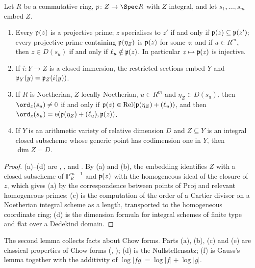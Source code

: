 \begin{lemma}\label{pf:covol:lem:emb}
Let $R$ be a commutative ring, $p\colon Z\to\Spec R$ with $Z$ integral, and let $s_1,\dots,s_m$ embed $Z$.
\begin{enumerate}[label=(\alph*)]
\item Every $\mathfrak{p}(z)$ is a projective prime; $z$ specialises to $z'$ if and only if
  $\mathfrak{p}(z)\subseteq\mathfrak{p}(z')$; every projective prime containing $\mathfrak{p}(\eta_Z)$ is
  $\mathfrak{p}(z)$ for some $z$; and if $u\in R^m$, then $z\in D(s_u)$ if and only if
  $\ell_u\notin\mathfrak{p}(z)$. In particular $z\mapsto\mathfrak{p}(z)$ is injective.
\item If $i\colon Y\to Z$ is a closed immersion, the restricted sections embed $Y$ and
  $\mathfrak{p}_Y(y)=\mathfrak{p}_Z(i(y))$.
\item If $R$ is Noetherian, $Z$ locally Noetherian, $u\in R^m$ and $\eta_Z\in D(s_u)$, then
  $\ord_z(s_u)\ne0$ if and only if $\mathfrak{p}(z)\in\operatorname{Rel}(\mathfrak{p}(\eta_Z)+(\ell_u))$, and then
  $\ord_z(s_u)=\covolLm(\covolPt(\eta_Z)+(\ell_u),\covolPt(z))$.
\item If $Y$ is an arithmetic variety of relative dimension $D$ and $Z\subseteq Y$ is an integral closed
  subscheme whose generic point has codimension one in $Y$, then $\dim Z=D$.
\end{enumerate}
\end{lemma}

\begin{proof}
(a)--(d) are , ,
 and . By (a)
and (b), the embedding identifies $Z$ with a closed subscheme of $\mathbb P^{m-1}_R$ and $\mathfrak{p}(z)$ with
the homogeneous ideal of the closure of $z$, which gives (a) by the correspondence between points of
$\mathrm{Proj}$ and relevant homogeneous primes; (c) is the computation of the order of a Cartier divisor
on a Noetherian integral scheme as a length, transported to the homogeneous coordinate ring; (d) is the
dimension formula for integral schemes of finite type and flat over a Dedekind domain.
\end{proof}

The second lemma collects facts about Chow forms. Parts (a), (b), (c) and (e) are classical properties of
Chow forms (\cite{ChowVanDerWaerden1937}, \cite[\S1]{Philippon1986}); (d) is the Nullstellensatz; (f) is
Gauss's lemma together with the additivity of $\log|fg|=\log|f|+\log|g|$.

